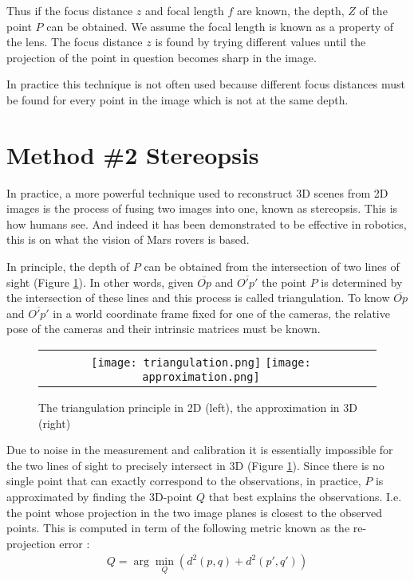 \documentclass[twoside]{article}
\begin{document}
Thus if the focus distance $z$ and focal length $f$ are known, the depth, $Z$ of the point $P$ can be obtained. We assume the focal length is known as a property of the lens. The focus distance $z$ is found by trying different values until the projection of the point in question becomes sharp in the image.

In practice this technique is not often used because different focus distances must be found for every point in the image which is not at the same depth.

\section{Method \#2 Stereopsis}

In practice, a more powerful technique used to reconstruct 3D scenes from 2D images is the process of fusing two images into one, known as stereopsis. This is how humans see. And indeed it has been demonstrated to be effective in robotics, this is on what the vision of Mars rovers is based.

In principle, the depth of $P$ can be obtained from the intersection of two lines of sight (Figure \ref{triangle}). In other words, given $\overline{Op}$ and $\overline{O'p'}$ the point $P$ is determined by the intersection of these lines and this process is called triangulation. To know $\overline{Op}$ and $\overline{O'p'}$ in a  world coordinate frame fixed for one of the cameras, the relative pose of the cameras and their intrinsic matrices must be known.

\begin{figure}[h!]
  \begin{center}
	\begin{tabular}{cc}
	  \texttt{[image: triangulation.png]}
	  \texttt{[image: approximation.png]}
	\end{tabular}
  \end{center}
  \caption{The triangulation principle in 2D (left), the approximation in 3D (right)}
  \label{triangle}
\end{figure}

Due to noise in the measurement and calibration it is essentially impossible for the two lines of sight to precisely intersect in 3D (Figure \ref{triangle}). Since there is no single point that can exactly correspond to the observations, in practice, $P$ is approximated by finding the 3D-point $Q$ that best explains the observations. I.e. the point whose projection in the two image planes is closest to the observed points. This is computed in term of the following metric known as the re-projection error :
\begin{align}
Q = \arg\!\min_Q (d^2(p, q) + d^2(p', q'))
\end{align}
\end{document}
